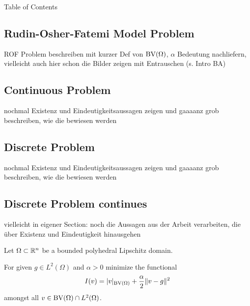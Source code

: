 \begin{frame}[noframenumbering]{Table of Contents}
\end{frame}

\subsection{Rudin-Osher-Fatemi Model Problem}
\begin{frame}
  ROF Problem beschreiben mit kurzer Def von $\textup{BV}(\Omega)$, $\alpha$ Bedeutung
  nachliefern, vielleicht auch hier schon die Bilder zeigen mit Entrauschen (s.
  Intro BA)
\end{frame}
\subsection{Continuous Problem}
\begin{frame}
  nochmal Existenz und Eindeutigkeitsaussagen zeigen und gaaaanz grob 
  beschreiben, wie die bewiesen werden
\end{frame}

\subsection{Discrete Problem}
\begin{frame}
  nochmal Existenz und Eindeutigkeitsaussagen zeigen und gaaaanz grob 
  beschreiben, wie die bewiesen werden
\end{frame}

\subsection{Discrete Problem continues}
\begin{frame}
  vielleicht in eigener Section: noch die Aussagen aus der Arbeit verarbeiten,
  die über Existenz und Eindeutigkeit hinausgehen
\end{frame}


\begin{frame}

  \bigskip
  \pause

  Let $\Omega\subset\mathbb{R}^n$ be a bounded polyhedral Lipschitz domain.

  \medskip

  For given $g\in L^2(\Omega)$ and $\alpha>0$ minimize the functional 
  \begin{align*}
    I(v)=|v|_{\textup{BV}(\Omega)}+\frac{\alpha}{2}\Vert v-g\Vert^2
  \end{align*}
  amongst all $v\in \textup{BV}(\Omega)\cap L^2(\Omega)$.
\end{frame}


